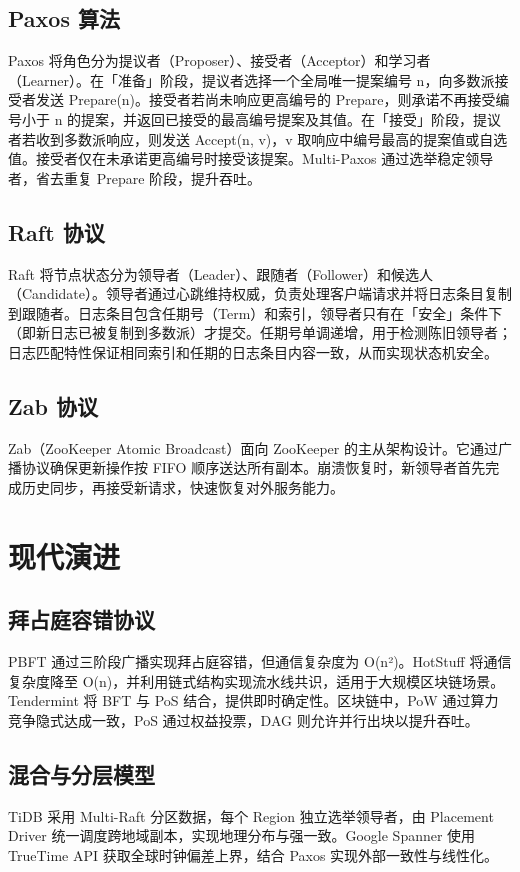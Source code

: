 \section{Paxos 算法}
Paxos 将角色分为提议者（Proposer）、接受者（Acceptor）和学习者（Learner）。在「准备」阶段，提议者选择一个全局唯一提案编号 n，向多数派接受者发送 Prepare(n)。接受者若尚未响应更高编号的 Prepare，则承诺不再接受编号小于 n 的提案，并返回已接受的最高编号提案及其值。在「接受」阶段，提议者若收到多数派响应，则发送 Accept(n, v)，v 取响应中编号最高的提案值或自选值。接受者仅在未承诺更高编号时接受该提案。Multi-Paxos 通过选举稳定领导者，省去重复 Prepare 阶段，提升吞吐。\par
\section{Raft 协议}
Raft 将节点状态分为领导者（Leader）、跟随者（Follower）和候选人（Candidate）。领导者通过心跳维持权威，负责处理客户端请求并将日志条目复制到跟随者。日志条目包含任期号（Term）和索引，领导者只有在「安全」条件下（即新日志已被复制到多数派）才提交。任期号单调递增，用于检测陈旧领导者；日志匹配特性保证相同索引和任期的日志条目内容一致，从而实现状态机安全。\par
\section{Zab 协议}
Zab（ZooKeeper Atomic Broadcast）面向 ZooKeeper 的主从架构设计。它通过广播协议确保更新操作按 FIFO 顺序送达所有副本。崩溃恢复时，新领导者首先完成历史同步，再接受新请求，快速恢复对外服务能力。\par
\chapter{现代演进}
\section{拜占庭容错协议}
PBFT 通过三阶段广播实现拜占庭容错，但通信复杂度为 O(n²)。HotStuff 将通信复杂度降至 O(n)，并利用链式结构实现流水线共识，适用于大规模区块链场景。Tendermint 将 BFT 与 PoS 结合，提供即时确定性。区块链中，PoW 通过算力竞争隐式达成一致，PoS 通过权益投票，DAG 则允许并行出块以提升吞吐。\par
\section{混合与分层模型}
TiDB 采用 Multi-Raft 分区数据，每个 Region 独立选举领导者，由 Placement Driver 统一调度跨地域副本，实现地理分布与强一致。Google Spanner 使用 TrueTime API 获取全球时钟偏差上界，结合 Paxos 实现外部一致性与线性化。\par
